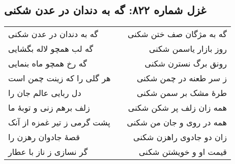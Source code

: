 \begin{center}
\section*{غزل شماره ۸۲۲: گه به دندان در عدن شکنی}
\label{sec:822}
\begin{longtable}{l p{0.5cm} r}
گه به دندان در عدن شکنی
&&
گه به مژگان صف ختن شکنی
\\
گه لب همچو لاله بگشایی
&&
روز بازار یاسمن شکنی
\\
گه رخ همچو ماه بنمایی
&&
رونق برگ نسترن شکنی
\\
هر گلی را که زینت چمن است
&&
ز سر طعنه در چمن شکنی
\\
دل ربایی عالم جان را
&&
طرهٔ مشک بر سمن شکنی
\\
زلف برهم زنی و توبهٔ ما
&&
همه زان زلف پر شکن شکنی
\\
پشت گرمی ز تیر غمزه از آنک
&&
همه در روی و جان من شکنی
\\
قصهٔ جادوان رهزن را
&&
زان دو جادوی راهزن شکنی
\\
گر نسازی ز ناز با عطار
&&
قیمت او و خویشتن شکنی
\\
\end{longtable}
\end{center}
